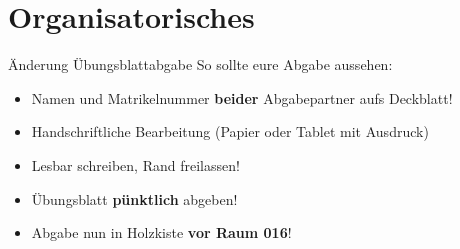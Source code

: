 
\newcommand{\handout}{}



\morescalingdelimiters



\section{Organisatorisches}

\begin{frame}[t]{Änderung Übungsblattabgabe}
	So sollte eure Abgabe aussehen:
	\begin{itemize}
		\item Namen und Matrikelnummer \textbf{beider} Abgabepartner aufs Deckblatt!
		\item Handschriftliche Bearbeitung (Papier oder Tablet mit Ausdruck)
		\item Lesbar schreiben, Rand freilassen!
		\item Übungsblatt \textbf{pünktlich} abgeben!
		\item Abgabe nun in Holzkiste \textbf{vor Raum 016}!
	\end{itemize}
\end{frame}

